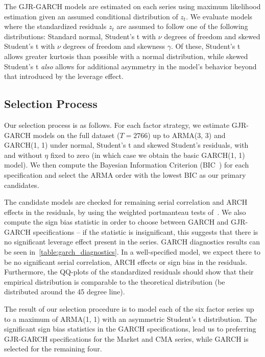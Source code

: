The GJR-GARCH models are estimated on each series using maximum likelihood estimation given an assumed conditional distribution of $z_t$. We evaluate models where the standardized residuals $z_t$ are assumed to follow one of the following distributions: Standard normal, Student's t with $\nu$ degrees of freedom and skewed Student's t with $\nu$ degrees of freedom and skewness $\gamma$. Of these, Student's t allows greater kurtosis than possible with a normal distribution, while skewed Student's t \emph{also} allows for additional asymmetry in the model's behavior beyond that introduced by the leverage effect.


\subsection{Selection Process} %
\label{sub:selection_process}

Our selection process is as follows. For each factor strategy, we estimate GJR-GARCH models on the full dataset ($T = 2766$) up to ARMA(3, 3) and GARCH(1, 1) under normal, Student's t and skewed Student's residuals, with and without $\eta$ fixed to zero (in which case we obtain the basic GARCH(1, 1) model). We then compute the Bayesian Information Criterion (BIC~\autocite{Schwarz1978}) for each specification and select the ARMA order with the lowest BIC as our primary candidates.

The candidate models are checked for remaining serial correlation and ARCH effects in the residuals, by using the weighted portmanteau tests of~\autocite{FisherGallagher2012}. We also compute the sign bias statistic in order to choose between GARCH and GJR-GARCH specifications -- if the statistic is insignificant, this suggests that there is no significant leverage effect present in the series. GARCH diagnostics results can be seen in~\autoref{table:garch_diagnostics}. In a well-specified model, we expect there to be no significant serial correlation, ARCH effects or sign bias in the residuals. Furthermore, the QQ-plots of the standardized residuals should show that their empirical distribution is comparable to the theoretical distribution (be distributed around the 45 degree line).


The result of our selection procedure is to model each of the six factor series up to a maximum of ARMA(1, 1) with an asymmetric Student's t distribution. The significant sign bias statistics in the GARCH specifications, lead us to preferring GJR-GARCH specifications for the Market and CMA series, while GARCH is selected for the remaining four.

